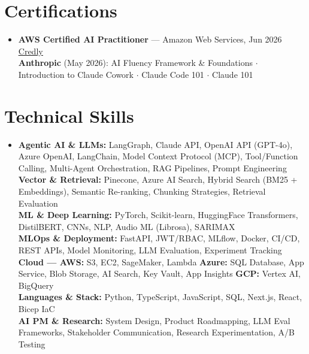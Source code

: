 \documentclass[letterpaper,10pt]{article}
\begin{document}
\section{Certifications}
\begin{itemize}[leftmargin=0.12in,label={},topsep=0pt]
  \small\item{
    \textbf{AWS Certified AI Practitioner} --- Amazon Web Services, Jun 2026 \hfill \href{https://www.credly.com/badges/c4f2a25d-6ba4-4349-a5e2-de8bf03459f3}{\underline{Credly}}\\
    \textbf{Anthropic} (May 2026): AI Fluency Framework \& Foundations $\cdot$ Introduction to Claude Cowork $\cdot$ Claude Code 101 $\cdot$ Claude 101
  }
\end{itemize}

\section{Technical Skills}
\begin{itemize}[leftmargin=0.12in,label={},topsep=0pt]
  \small\item{
    \textbf{Agentic AI \& LLMs:} LangGraph, Claude API, OpenAI API (GPT-4o), Azure OpenAI, LangChain, Model Context Protocol (MCP), Tool/Function Calling, Multi-Agent Orchestration, RAG Pipelines, Prompt Engineering\\
    \textbf{Vector \& Retrieval:} Pinecone, Azure AI Search, Hybrid Search (BM25 + Embeddings), Semantic Re-ranking, Chunking Strategies, Retrieval Evaluation\\
    \textbf{ML \& Deep Learning:} PyTorch, Scikit-learn, HuggingFace Transformers, DistilBERT, CNNs, NLP, Audio ML (Librosa), SARIMAX\\
    \textbf{MLOps \& Deployment:} FastAPI, JWT/RBAC, MLflow, Docker, CI/CD, REST APIs, Model Monitoring, LLM Evaluation, Experiment Tracking\\
    \textbf{Cloud --- AWS:} S3, EC2, SageMaker, Lambda \quad \textbf{Azure:} SQL Database, App Service, Blob Storage, AI Search, Key Vault, App Insights \quad \textbf{GCP:} Vertex AI, BigQuery\\
    \textbf{Languages \& Stack:} Python, TypeScript, JavaScript, SQL, Next.js, React, Bicep IaC\\
    \textbf{AI PM \& Research:} System Design, Product Roadmapping, LLM Eval Frameworks, Stakeholder Communication, Research Experimentation, A/B Testing
  }
\end{itemize}
\end{document}

